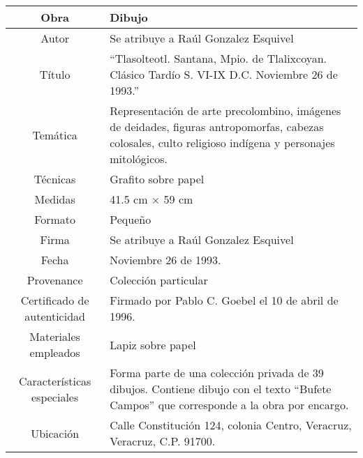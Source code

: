 \begin{table}[H]
\centering
\begin{tabular}{|c|m{}|}
\hline
Obra& Dibujo	\\
\hline
Autor & Se atribuye a Ra\'ul Gonzalez Esquivel\\
\hline
T\'itulo & ``Tlasolteotl. Santana, Mpio. de Tlalixcoyan. Cl\'asico Tard\'io S. VI-IX D.C. Noviembre 26 de 1993.''\\
\hline
Tem\'atica & Representaci\'on de arte precolombino, im\'agenes de deidades, figuras antropomorfas, cabezas colosales, culto religioso ind\'igena y personajes mitol\'ogicos.\\
\hline
T\'ecnicas &Grafito sobre papel \\
\hline
Medidas & 41.5 cm $\times$ 59 cm \\
\hline
 Formato & Peque\~no \\
 \hline
 Firma & Se atribuye a Ra\'ul Gonzalez Esquivel\\ 
 \hline
  Fecha & Noviembre 26 de 1993. \\
 \hline
 Provenance & Colecci\'on particular\\
 \hline
 Certificado de autenticidad& Firmado por Pablo C. Goebel el 10 de abril de 1996.  \\
 \hline 
  Materiales empleados & Lapiz sobre papel\\
 \hline
 Caracter\'isticas especiales & Forma parte de una colecci\'on privada de 39 dibujos. 
Contiene dibujo con el texto ``Bufete Campos'' que corresponde a la obra por encargo. \\
\hline 
Ubicaci\'on & Calle Constituci\'on 124, colonia Centro, Veracruz, Veracruz, C.P. 91700.\\
\hline

\end{tabular}
\end{table}

